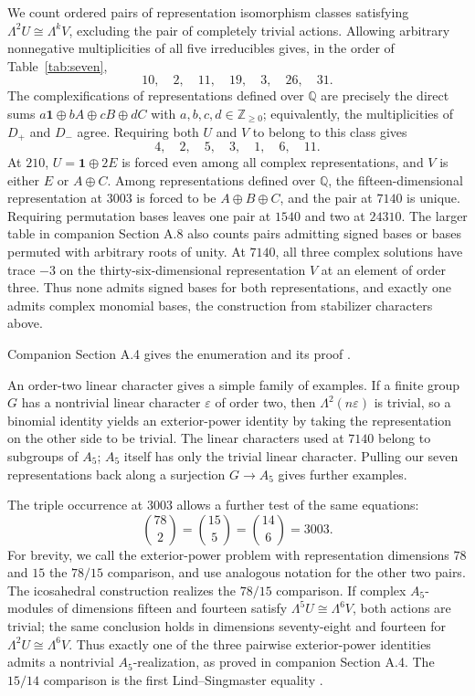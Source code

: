 \documentclass[11pt,a4paper]{article}
\begin{document}
We count ordered pairs of representation isomorphism classes satisfying $\Lambda^2U\cong\Lambda^kV$, excluding the pair of completely trivial actions. Allowing arbitrary nonnegative multiplicities of all five irreducibles gives, in the order of Table~\ref{tab:seven},
\[
10,\quad2,\quad11,\quad19,\quad3,\quad26,\quad31.
\]
The complexifications of representations defined over $\mathbb Q$ are precisely the direct sums $a\mathbf1\oplus bA\oplus cB\oplus dC$ with $a,b,c,d\in\mathbb Z_{\geq0}$; equivalently, the multiplicities of $D_+$ and $D_-$ agree. Requiring both $U$ and $V$ to belong to this class gives
\[
4,\quad2,\quad5,\quad3,\quad1,\quad6,\quad11.
\]
At $210$, $U=\mathbf1\oplus2E$ is forced even among all complex representations, and $V$ is either $E$ or $A\oplus C$. Among representations defined over $\mathbb Q$, the fifteen-dimensional representation at $3003$ is forced to be $A\oplus B\oplus C$, and the pair at $7140$ is unique. Requiring permutation bases leaves one pair at $1540$ and two at $24310$. The larger table in companion Section A.8 also counts pairs admitting signed bases or bases permuted with arbitrary roots of unity. At $7140$, all three complex solutions have trace $-3$ on the thirty-six-dimensional representation $V$ at an element of order three. Thus none admits signed bases for both representations, and exactly one admits complex monomial bases, the construction from stabilizer characters above.

Companion Section A.4 gives the enumeration and its proof \citep{Companion2026}.

An order-two linear character gives a simple family of examples. If a finite group $G$ has a nontrivial linear character $\varepsilon$ of order two, then $\Lambda^2(n\varepsilon)$ is trivial, so a binomial identity yields an exterior-power identity by taking the representation on the other side to be trivial. The linear characters used at $7140$ belong to subgroups of $A_5$; $A_5$ itself has only the trivial linear character. Pulling our seven representations back along a surjection $G\to A_5$ gives further examples.

The triple occurrence at $3003$ allows a further test of the same equations:
\[
\binom{78}{2}=\binom{15}{5}=\binom{14}{6}=3003.
\]
For brevity, we call the exterior-power problem with representation dimensions $78$ and $15$ the $78/15$ comparison, and use analogous notation for the other two pairs. The icosahedral construction realizes the $78/15$ comparison. If complex $A_5$-modules of dimensions fifteen and fourteen satisfy $\Lambda^5U\cong\Lambda^6V$, both actions are trivial; the same conclusion holds in dimensions seventy-eight and fourteen for $\Lambda^2U\cong\Lambda^6V$. Thus exactly one of the three pairwise exterior-power identities admits a nontrivial $A_5$-realization, as proved in companion Section A.4. The $15/14$ comparison is the first Lind--Singmaster equality \citep{Lind1968,Singmaster1975}.
\end{document}
